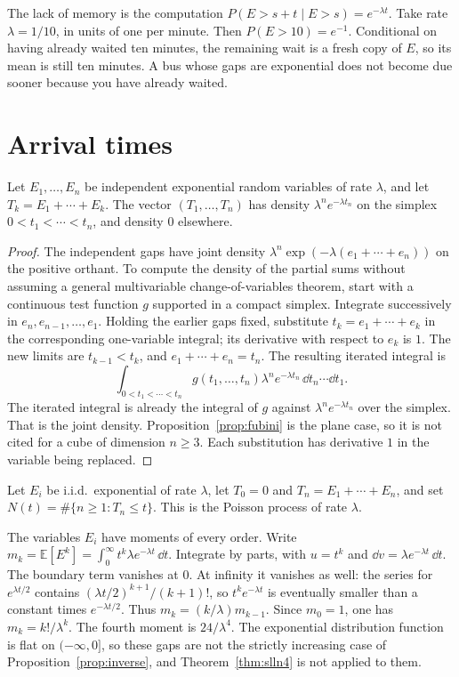 The lack of memory is the computation $P(E>s+t\mid E>s)=e^{-\lambda t}$. Take rate $\lambda=1/10$, in units of one per minute. Then $P(E>10)=e^{-1}$. Conditional on having already waited ten minutes, the remaining wait is a fresh copy of $E$, so its mean is still ten minutes. A bus whose gaps are exponential does not become due sooner because you have already waited.

\section{Arrival times}

\begin{lemma}\label{lem:gamma}
Let $E_1,\ldots,E_n$ be independent exponential random variables of rate $\lambda$, and let $T_k=E_1+\cdots+E_k$. The vector $(T_1,\ldots,T_n)$ has density $\lambda^n e^{-\lambda t_n}$ on the simplex $0<t_1<\cdots<t_n$, and density $0$ elsewhere.
\end{lemma}
\begin{proof}
The independent gaps have joint density $\lambda^n\exp(-\lambda(e_1+\cdots+e_n))$ on the positive orthant. To compute the density of the partial sums without assuming a general multivariable change-of-variables theorem, start with a continuous test function $g$ supported in a compact simplex. Integrate successively in $e_n,e_{n-1},\ldots,e_1$. Holding the earlier gaps fixed, substitute $t_k=e_1+\cdots+e_k$ in the corresponding one-variable integral; its derivative with respect to $e_k$ is $1$. The new limits are $t_{k-1}<t_k$, and $e_1+\cdots+e_n=t_n$. The resulting iterated integral is
\[
 \int_{0<t_1<\cdots<t_n}g(t_1,\ldots,t_n)\lambda^n e^{-\lambda t_n}\,\dd t_n\cdots\dd t_1.
\]
The iterated integral is already the integral of $g$ against $\lambda^n e^{-\lambda t_n}$ over the simplex. That is the joint density. Proposition~\ref{prop:fubini} is the plane case, so it is not cited for a cube of dimension $n\ge3$. Each substitution has derivative $1$ in the variable being replaced.
\end{proof}

\begin{definition}\label{def:pp}
Let $E_i$ be i.i.d.\ exponential of rate $\lambda$, let $T_0=0$ and $T_n=E_1+\cdots+E_n$, and set $N(t)=\#\{n\ge1:T_n\le t\}$. This is the Poisson process of rate $\lambda$.
\end{definition}

The variables $E_i$ have moments of every order. Write $m_k=\mathbb E[E^k]=\int_0^\infty t^k\lambda e^{-\lambda t}\,\dd t$. Integrate by parts, with $u=t^k$ and $\dd v=\lambda e^{-\lambda t}\,\dd t$. The boundary term vanishes at $0$. At infinity it vanishes as well: the series for $e^{\lambda t/2}$ contains $(\lambda t/2)^{k+1}/(k+1)!$, so $t^k e^{-\lambda t}$ is eventually smaller than a constant times $e^{-\lambda t/2}$. Thus $m_k=(k/\lambda)m_{k-1}$. Since $m_0=1$, one has $m_k=k!/\lambda^k$. The fourth moment is $24/\lambda^4$. The exponential distribution function is flat on $(-\infty,0]$, so these gaps are not the strictly increasing case of Proposition~\ref{prop:inverse}, and Theorem~\ref{thm:slln4} is not applied to them.

